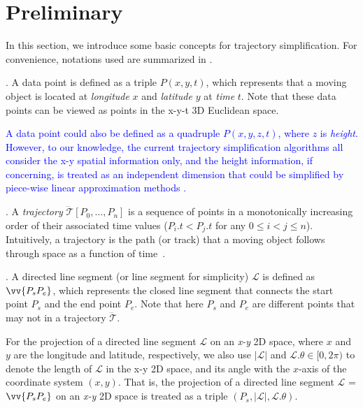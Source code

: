 \section{Preliminary}	%
\label{sec-problem}


In this section, we introduce some basic concepts for trajectory simplification.
For convenience, notations used are summarized in .

. A data point is defined as a triple $P(x, y, t)$, which represents that a moving object is located at {\em longitude} $x$ and {\em latitude} $y$ at {\em time} $t$. Note that these data points can be viewed as points in the x-y-t 3D Euclidean space.

\textcolor{blue}{A data point could also be defined as a quadruple $P(x, y, z, t)$, where $z$ is {\em height}. However, to our knowledge, the current trajectory simplification algorithms all consider the x-y spatial information only, and the height information, if concerning, is treated as an independent dimension that could be simplified by piece-wise linear approximation methods \cite{Agarwal:Metric, ORourke:Fitting, Keogh:online, Luo:Streaming, Xie:Stream,Elmeleegy:Stream}.}


. A \textit{trajectory} $\dddot{\mathcal{T}}\left[P_0, \ldots, P_n\right]$ is a sequence of points in a monotonically increasing order of their associated time values (\ie $P_i.t < P_j.t$ for any $0\le i<j\le n$). %
Intuitively, a trajectory is the path (or track) that a moving object follows through space as a function of time~\cite{physics-trajectory}.

. A directed line segment (or line segment for simplicity) $\mathcal{L}$ is defined as $\vv{P_{s}P_{e}}$, which represents the closed line segment that connects the start point $P_s$ and the end point $P_e$.
Note that here $P_s$ and $P_e$ are different points that may not in a trajectory $\dddot{\mathcal{T}}$.


For the projection of a directed line segment $\mathcal{L}$ on an \emph{x-y} 2D space, where $x$ and $y$ are the longitude and latitude, respectively, we also use $|\mathcal{L}|$ and $\mathcal{L}.\theta\in [0, 2\pi)$ to denote the length of $\mathcal{L}$ in the x-y 2D space, and its angle with the $x$-axis of the coordinate system $(x, y)$.  That is, the projection of a directed line segment $\mathcal{L}$ = $\vv{P_{s}P_{e}}$ on an \emph{x-y} 2D space is treated as a triple $(P_s, |\mathcal{L}|, \mathcal{L}.\theta)$.

